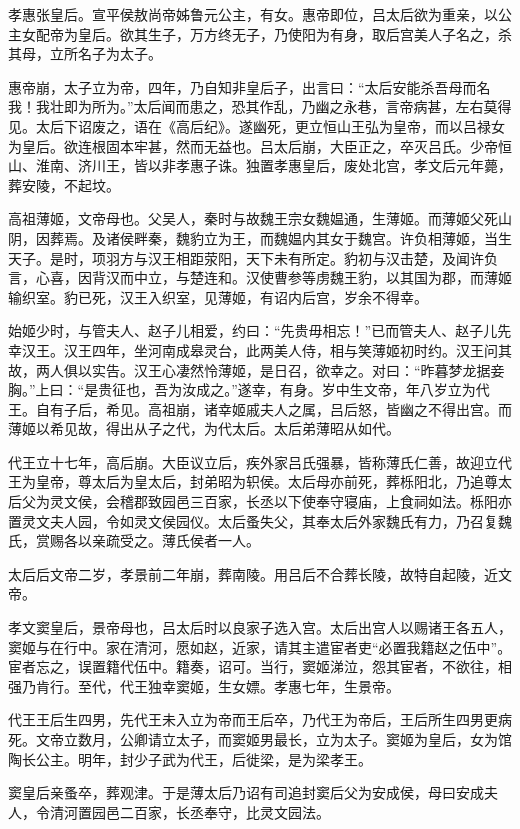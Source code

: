 \documentclass[]{article}
\begin{document}
孝惠张皇后。宣平侯敖尚帝姊鲁元公主，有女。惠帝即位，吕太后欲为重亲，以公主女配帝为皇后。欲其生子，万方终无子，乃使阳为有身，取后宫美人子名之，杀其母，立所名子为太子。

惠帝崩，太子立为帝，四年，乃自知非皇后子，出言曰：``太后安能杀吾母而名我！我壮即为所为。''太后闻而患之，恐其作乱，乃幽之永巷，言帝病甚，左右莫得见。太后下诏废之，语在《高后纪》。遂幽死，更立恒山王弘为皇帝，而以吕禄女为皇后。欲连根固本牢甚，然而无益也。吕太后崩，大臣正之，卒灭吕氏。少帝恒山、淮南、济川王，皆以非孝惠子诛。独置孝惠皇后，废处北宫，孝文后元年薨，葬安陵，不起坟。

高祖薄姬，文帝母也。父吴人，秦时与故魏王宗女魏媪通，生薄姬。而薄姬父死山阴，因葬焉。及诸侯畔秦，魏豹立为王，而魏媪内其女于魏宫。许负相薄姬，当生天子。是时，项羽方与汉王相距荥阳，天下未有所定。豹初与汉击楚，及闻许负言，心喜，因背汉而中立，与楚连和。汉使曹参等虏魏王豹，以其国为郡，而薄姬输织室。豹已死，汉王入织室，见薄姬，有诏内后宫，岁余不得幸。

始姬少时，与管夫人、赵子儿相爱，约曰：``先贵毋相忘！''已而管夫人、赵子儿先幸汉王。汉王四年，坐河南成皋灵台，此两美人侍，相与笑薄姬初时约。汉王问其故，两人俱以实告。汉王心凄然怜薄姬，是日召，欲幸之。对曰：``昨暮梦龙据妾胸。''上曰：``是贵征也，吾为汝成之。''遂幸，有身。岁中生文帝，年八岁立为代王。自有子后，希见。高祖崩，诸幸姬戚夫人之属，吕后怒，皆幽之不得出宫。而薄姬以希见故，得出从子之代，为代太后。太后弟薄昭从如代。

代王立十七年，高后崩。大臣议立后，疾外家吕氏强暴，皆称薄氏仁善，故迎立代王为皇帝，尊太后为皇太后，封弟昭为轵侯。太后母亦前死，葬栎阳北，乃追尊太后父为灵文侯，会稽郡致园邑三百家，长丞以下使奉守寝庙，上食祠如法。栎阳亦置灵文夫人园，令如灵文侯园仪。太后蚤失父，其奉太后外家魏氏有力，乃召复魏氏，赏赐各以亲疏受之。薄氏侯者一人。

太后后文帝二岁，孝景前二年崩，葬南陵。用吕后不合葬长陵，故特自起陵，近文帝。

孝文窦皇后，景帝母也，吕太后时以良家子选入宫。太后出宫人以赐诸王各五人，窦姬与在行中。家在清河，愿如赵，近家，请其主遣宦者吏``必置我籍赵之伍中''。宦者忘之，误置籍代伍中。籍奏，诏可。当行，窦姬涕泣，怨其宦者，不欲往，相强乃肯行。至代，代王独幸窦姬，生女嫖。孝惠七年，生景帝。

代王王后生四男，先代王未入立为帝而王后卒，乃代王为帝后，王后所生四男更病死。文帝立数月，公卿请立太子，而窦姬男最长，立为太子。窦姬为皇后，女为馆陶长公主。明年，封少子武为代王，后徙梁，是为梁孝王。

窦皇后亲蚤卒，葬观津。于是薄太后乃诏有司追封窦后父为安成侯，母曰安成夫人，令清河置园邑二百家，长丞奉守，比灵文园法。
\end{document}
